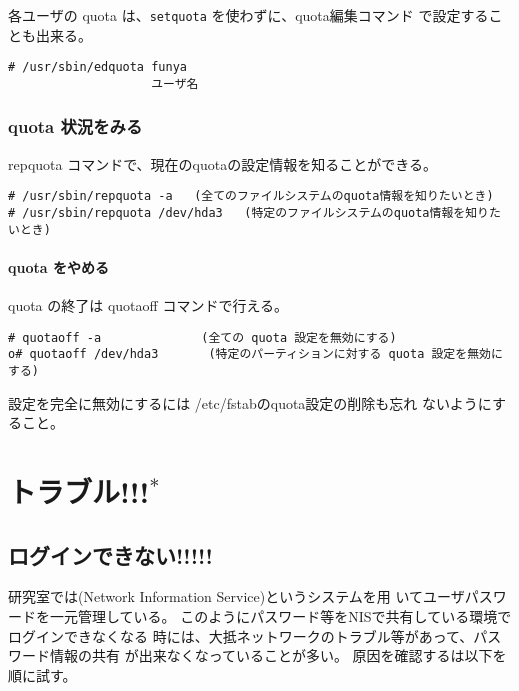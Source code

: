 \documentclass{jreport}
\begin{document}
各ユーザの quota は、\verb|setquota| を使わずに、quota編集コマンド
 で設定することも出来る。
\begin{screen}
\begin{verbatim}
# /usr/sbin/edquota funya
                    ユーザ名
\end{verbatim}
\end{screen}

\subsection{quota 状況をみる}
repquota コマンドで、現在のquotaの設定情報を知ることができる。
\begin{screen}
\begin{verbatim}
# /usr/sbin/repquota -a   (全てのファイルシステムのquota情報を知りたいとき)
# /usr/sbin/repquota /dev/hda3   (特定のファイルシステムのquota情報を知りたいとき)
\end{verbatim}
\end{screen}

\subsubsection{quota をやめる}
quota の終了は quotaoff コマンドで行える。
\begin{screen}
\begin{verbatim}
# quotaoff -a              (全ての quota 設定を無効にする)
o# quotaoff /dev/hda3       (特定のパーティションに対する quota 設定を無効にする)
\end{verbatim}
\end{screen}

設定を完全に無効にするには {\ttfamily /etc/fstab}のquota設定の削除も忘れ
ないようにすること。



\chapter{トラブル!!!$^*$}

\section{ログインできない!!!!!}

研究室では(Network Information Service)というシステムを用
いてユーザパスワードを一元管理している。
このようにパスワード等をNISで共有している環境でログインできなくなる
時には、大抵ネットワークのトラブル等があって、パスワード情報の共有
が出来なくなっていることが多い。
原因を確認するは以下を順に試す。
\end{document}
